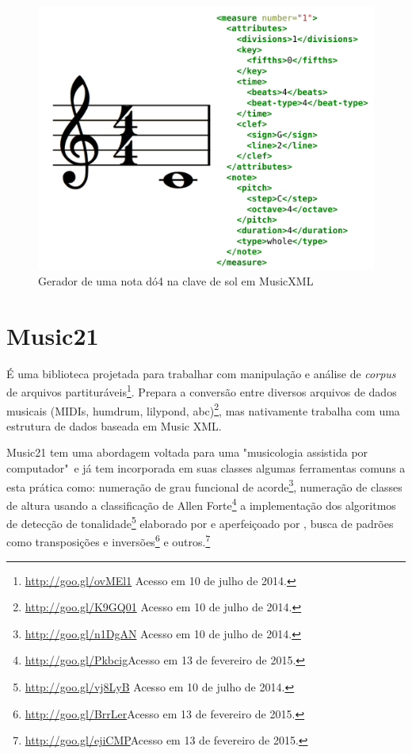 \documentclass[
	12pt,				%
	openright,			%
	twoside,			%
	a4paper,			%
	english,			%
	french,				%
	spanish,			%
	brazil				%
	]{abntex2}
\begin{document}
\begin{figure}[htb]
	\caption{\label{fig_grafico}Gerador de uma nota dó4 na clave de sol em MusicXML}
	\begin{center}
	    \includegraphics[scale=0.5]{score/musicxml.pdf}
	\end{center}
\end{figure}


\section{Music21}
\label{m21}

É uma biblioteca projetada para trabalhar com manipulação e análise de \textit{corpus} de arquivos partituráveis\footnote{\url{http://goo.gl/ovMEl1} Acesso em 10 de julho de 2014.}. Prepara a conversão entre diversos arquivos de dados musicais (MIDIs, humdrum, lilypond, abc)\footnote{\url{http://goo.gl/K9GQ01} Acesso em 10 de julho de 2014.}, mas nativamente trabalha com uma estrutura de dados baseada em Music XML.

Music21 tem uma abordagem voltada para uma "musicologia assistida por computador"\ e já tem incorporada em suas classes algumas ferramentas comuns a esta prática como: numeração de grau funcional de acorde\footnote{\url{http://goo.gl/n1DgAN} Acesso em 10 de julho de 2014.}, numeração de classes de altura usando a classificação de Allen Forte\footnote{\url{http://goo.gl/Pkbcig}Acesso em 13 de fevereiro de 2015.} a implementação dos algoritmos de detecção de tonalidade\footnote{\url{http://goo.gl/vj8LyB} Acesso em 10 de julho de 2014.} elaborado por  e aperfeiçoado por , busca de padrões como transposições e inversões\footnote{\url{http://goo.gl/BrrLer}Acesso em 13 de fevereiro de 2015.} e outros.\footnote{{\url{http://goo.gl/ejiCMP}Acesso em 13 de fevereiro de 2015.}}
\end{document}
